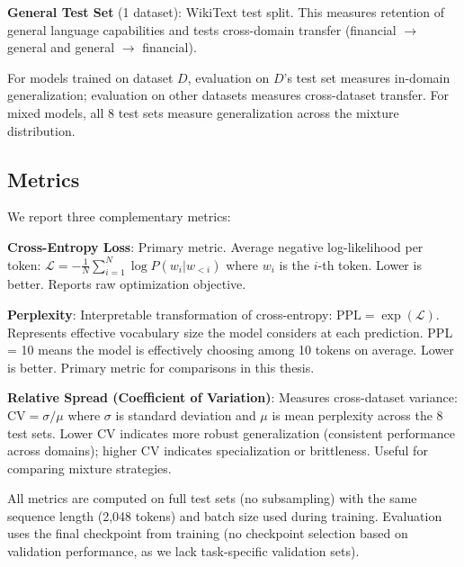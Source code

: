 \textbf{General Test Set} (1 dataset): WikiText test split. This measures retention of general language capabilities and tests cross-domain transfer (financial $\to$ general and general $\to$ financial).

For models trained on dataset $D$, evaluation on $D$'s test set measures in-domain generalization; evaluation on other datasets measures cross-dataset transfer. For mixed models, all 8 test sets measure generalization across the mixture distribution.

\subsection{Metrics}

We report three complementary metrics:

\textbf{Cross-Entropy Loss}: Primary metric. Average negative log-likelihood per token: $\mathcal{L} = -\frac{1}{N}\sum_{i=1}^{N} \log P(w_i | w_{<i})$ where $w_i$ is the $i$-th token. Lower is better. Reports raw optimization objective.

\textbf{Perplexity}: Interpretable transformation of cross-entropy: $\text{PPL} = \exp(\mathcal{L})$. Represents effective vocabulary size the model considers at each prediction. PPL = 10 means the model is effectively choosing among 10 tokens on average. Lower is better. Primary metric for comparisons in this thesis.

\textbf{Relative Spread (Coefficient of Variation)}: Measures cross-dataset variance: $\text{CV} = \sigma / \mu$ where $\sigma$ is standard deviation and $\mu$ is mean perplexity across the 8 test sets. Lower CV indicates more robust generalization (consistent performance across domains); higher CV indicates specialization or brittleness. Useful for comparing mixture strategies.

All metrics are computed on full test sets (no subsampling) with the same sequence length (2,048 tokens) and batch size used during training. Evaluation uses the final checkpoint from training (no checkpoint selection based on validation performance, as we lack task-specific validation sets).